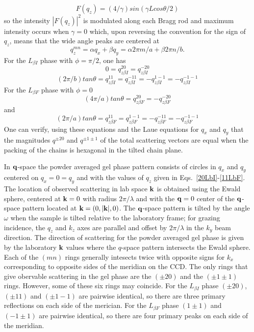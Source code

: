 \begin{equation}\label{int}
F(q_z) = (4/\gamma)sin({\gamma}Lcos{\theta}/2)
\end{equation}
so the intensity $|F(q_z)|^2$ is modulated along each Bragg rod and maximum 
intensity occurs when $\gamma=0$ which, upon reversing the convention for the 
sign of $q_z$, means that the wide angle peaks are centered at
\begin{equation}\label{centers}
q_z^{mn}={\alpha}q_x+{\beta}q_y=\alpha2\pi{m}/a+\beta2\pi{n}/b.
\end{equation}
For the $L_{{\beta}I}$ phase with ${\phi}={\pi}/2$, one has
\begin{equation}\label{20LbI}
0=q_{z{\beta}I}^{20}=q_{z{\beta}I}^{-20}
\end{equation}
\begin{equation}\label{11LbI}
(2\pi/b)tan{\theta}=q_{z{\beta}I}^{11}=q_{z{\beta}I}^{-11}=-q_{z{\beta}I}^{1-1}=-q_{z{\beta}I}^{-1-1}
\end{equation}
For the $L_{{\beta}F}$ phase with ${\phi}=0$
\begin{equation}\label{20LbF}
(4\pi/a)tan{\theta}=q_{z{\beta}F}^{20}=-q_{z{\beta}F}^{-20}
\end{equation}
and
\begin{equation}\label{11LbF}
(2\pi/a)tan{\theta}=q_{z{\beta}F}^{11}=q_{z{\beta}F}^{1-1}=-q_{z{\beta}F}^{-11}=-q_{z{\beta}F}^{-1-1}
\end{equation}
One can verify, using these equations and the Laue equations for $q_x$ and $q_y$ 
that the magnitudes $q^{{\pm}20}$ and $q^{{\pm}1{\pm}1}$ of the total scattering 
vectors are equal when the packing of the chains is hexagonal in the tilted chain 
plane.  

In $\bold{q}$-space the powder averaged gel phase pattern consists of circles 
in $q_x$ and $q_y$ centered on $q_x=0=q_y$ and with the values of $q_z$ given 
in Eqs.~\ref{20LbI}-\ref{11LbF}.  
The location of observed scattering in lab space $\bold{k}$ is obtained using 
the Ewald sphere, centered at $\bold{k}=0$ with radius $2\pi/\lambda$ and with 
the $\bold{q}=0$ center of the $\bold{q}$-space pattern located 
at $\bold{k}=(0,|\bold{k}|,0)$.  The $\bold{q}$-space pattern is tilted by the 
angle $\omega$ when the sample is tilted relative to the laboratory frame; for 
grazing incidence, the $q_z$ and $k_z$ axes are parallel and offset 
by $2\pi/\lambda$ in the $k_y$ beam direction.  The direction of scattering for 
the powder averaged gel phase is given by the laboratory $\bold{k}$ values 
where the $q$-space pattern intersects the Ewald sphere.  Each of the $(mn)$ 
rings generally intesects twice with opposite signs for $k_x$ corresponding to 
opposite sides of the meridian on the CCD.  The only rings that give obervable 
scattering in the gel phase are the $(\pm20)$ and the $(\pm1\pm1)$ rings.  
However, some of these six rings may coincide. For the $L_{{\beta}I}$ phase 
$(\pm20)$, $(\pm11)$ and $(\pm1-1)$ are pairwise identical, so there are three 
primary reflections on each side of the merician. For the $L_{{\beta}F}$ phase 
$(1\pm1)$ and $(-1\pm1)$ are pairwise identical, so there are four primary peaks 
on each side of the meridian.

